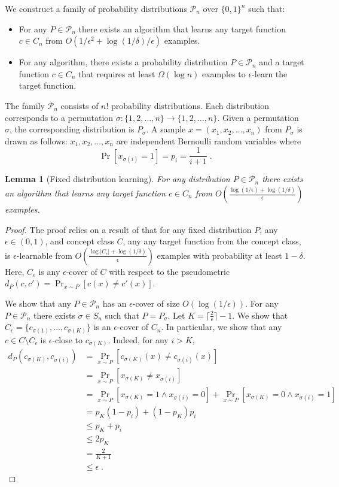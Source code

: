 \documentclass[12pt]{article}
\newtheorem{lemma}[proposition]{Lemma}
\renewcommand{\P}{\mathcal{P}}
\begin{document}
We construct a family of probability distributions $\P_n$ over $\{0,1\}^n$ such that:
\begin{itemize}
\item For any $P \in \P_n$ there exists an algorithm that learns
any target function $c \in C_n$ from $O(1/\epsilon^2 + \log(1/\delta)/\epsilon)$ examples.
\item For any algorithm, there exists
a probability distribution $P \in \P_n$ and a target function $c \in C_n$
that requires at least $\Omega(\log n)$ examples to $\epsilon$-learn the target function.
\end{itemize}

The family $\P_n$ consists of $n!$ probability distributions. Each distribution
corresponds to a permutation $\sigma:\{1,2,\dots,n\} \to \{1,2,\dots,n\}$. Given
a permutation $\sigma$, the corresponding distribution is $P_\sigma$.
A sample $x = (x_1, x_2, \dots, x_n)$ from $P_\sigma$ is drawn as follows:
$x_1, x_2, \dots, x_n$ are independent Bernoulli random variables
where
$$
\Pr[x_{\sigma(i)} = 1] = p_i = \frac{1}{i + 1} \; .
$$

\begin{lemma}[Fixed distribution learning]
For any distribution $P \in \P_n$ there exists an algorithm that
learns any target function $c \in C_n$ from $O \left( \frac{\log(1/\epsilon) + \log(1/\delta)}{\epsilon} \right)$
examples.
\end{lemma}

\begin{proof}
The proof relies on a result of \cite{Benedek-Itai-1991} that for any fixed
distribution $P$, any $\epsilon \in (0,1)$, and concept class $C$, any any
target function from the concept class, is $\epsilon$-learnable from
$O \left( \frac{\log |C_\epsilon| + \log (1/\delta)}{\epsilon}\right)$ examples with probability at least
$1-\delta$. Here, $C_\epsilon$ is any $\epsilon$-cover of $C$ with respect
to the pseudometric $d_P(c,c') = \Pr_{x \sim P}[c(x) \neq c'(x)]$.

We show that any $P \in \P_n$ has an $\epsilon$-cover of size
$O(\log(1/\epsilon))$. For any $P \in \P_n$ there exists $\sigma \in S_n$ such that
$P = P_\sigma$. Let $K = \lceil \frac{2}{\epsilon} \rceil - 1$. We show that
$C_\epsilon = \{c_{\sigma(1)}, \dots, c_{\sigma(K)}\}$ is an $\epsilon$-cover of
$C_n$. In particular, we show that any $c \in C \setminus C_\epsilon$ is
$\epsilon$-close to $c_{\sigma(K)}$. Indeed, for any $i > K$,
\begin{align*}
d_P(c_{\sigma(K)}, c_{\sigma(i)})
& = \Pr_{x \sim P}[c_{\sigma(K)}(x) \neq c_{\sigma(i)}(x)] \\
& = \Pr_{x \sim P}[x_{\sigma(K)} \neq x_{\sigma(i)}] \\
& = \Pr_{x \sim P}[x_{\sigma(K)} = 1 \wedge x_{\sigma(i)} = 0] + \Pr_{x \sim P}[x_{\sigma(K)} = 0 \wedge x_{\sigma(i)} = 1] \\
& = p_K(1 - p_i) + (1-p_K) p_i \\
& \le p_K + p_i \\
& \le 2 p_K \\
& = \frac{2}{K + 1} \\
& \le \epsilon \; .
\end{align*}
\end{proof}
\end{document}
